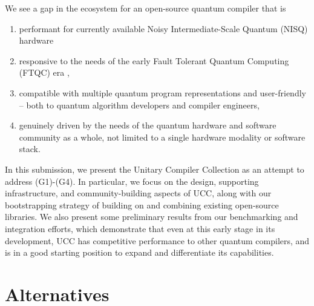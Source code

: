 \documentclass[conference]{IEEEtran}
\begin{document}
We see a gap in the ecosystem for an open-source quantum compiler that is

\begin{enumerate}[label=G\arabic*]
    \item performant for currently available Noisy Intermediate-Scale Quantum (NISQ) hardware \cite{nisq_2018}
    \item responsive to the needs of the early Fault Tolerant Quantum Computing (FTQC) era \cite{early_ft_2024},
    \item compatible with multiple quantum program representations and user-friendly -- both to quantum algorithm developers and compiler engineers,
    \item genuinely driven by the needs of the quantum hardware and software community as a whole, not limited to a single hardware modality or software stack.
\end{enumerate}

In this submission, we present the Unitary Compiler Collection as an attempt to address (G1)-(G4). In particular, we focus on the design, supporting infrastructure, and community-building aspects of UCC, along with our bootstrapping strategy of building on and combining existing open-source libraries. We also present some preliminary results from our benchmarking and integration efforts, which demonstrate that even at this early stage in its development, UCC has competitive performance to other quantum compilers, and is in a good starting position to expand and differentiate its capabilities.

\section{Alternatives} \label{alternatives}
\end{document}
